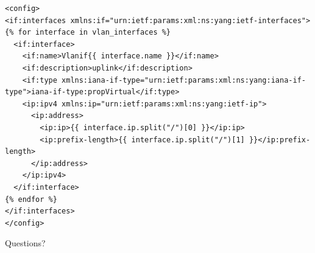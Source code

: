 \documentclass[aspectratio=169]{beamer}
\begin{document}
\begin{frame}[fragile]
  \begin{verbatim}
<config>
<if:interfaces xmlns:if="urn:ietf:params:xml:ns:yang:ietf-interfaces">
{% for interface in vlan_interfaces %}
  <if:interface>
    <if:name>Vlanif{{ interface.name }}</if:name>
    <if:description>uplink</if:description>
    <if:type xmlns:iana-if-type="urn:ietf:params:xml:ns:yang:iana-if-type">iana-if-type:propVirtual</if:type>
    <ip:ipv4 xmlns:ip="urn:ietf:params:xml:ns:yang:ietf-ip">
      <ip:address>
        <ip:ip>{{ interface.ip.split("/")[0] }}</ip:ip>
        <ip:prefix-length>{{ interface.ip.split("/")[1] }}</ip:prefix-length>
      </ip:address>
    </ip:ipv4>
  </if:interface>
{% endfor %}
</if:interfaces>
</config>
\end{verbatim}
\end{frame}


{
\begin{frame}[plain,c]
  \begin{center}
    \Huge \color[rgb]{1,1,1}Questions?
  \end{center}
\end{frame}
}
\end{document}

